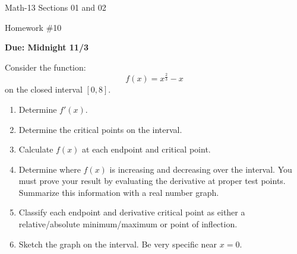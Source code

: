 \documentclass[letterpaper,12pt,fleqn]{article}
\begin{document}
\begin{center}
  \large
  Math-13 Sections 01 and 02

  \Large
  Homework \#10

  \large
  \textbf{Due: Midnight 11/3}
\end{center}

\vspace{0.5in}

Consider the function:
\[f(x)=x^{\frac{2}{3}}-x\]
on the closed interval \([0,8]\).
\begin{enumerate}[left=0in]
\item Determine \(f'(x)\).
\item Determine the critical points on the interval.
\item Calculate \(f(x)\) at each endpoint and critical point.
\item Determine where \(f(x)\) is increasing and decreasing over the interval.  You must prove your result by
  evaluating the derivative at proper test points.  Summarize this information with a real number graph.
\item Classify each endpoint and derivative critical point as either a relative/absolute minimum/maximum or
  point of inflection.
\item Sketch the graph on the interval.  Be very specific near \(x=0\).
\end{enumerate}
\end{document}
